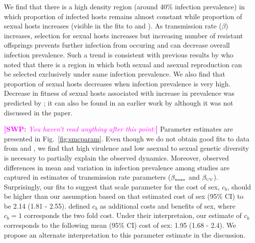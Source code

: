 \documentclass{article}\usepackage[]{graphicx}\usepackage[]{color}
\newcommand{\comment}[3]{\textcolor{#1}{\textbf{[#2: }\textit{#3}\textbf{]}}}
\newcommand{\swp}[1]{\comment{magenta}{SWP}{#1}}
\newcommand{\fref}[1]{Fig.~\ref{fig:#1}}
\begin{document}
We find that there is a high density region (around 40\% infection prevalence) in which proportion of infected hosts remains almost constant while proportion of sexual hosts increases (visible in the fits to \cite{mckone2016fine} and \cite{vergara2014infection}).
As transmission rate ($\beta$) increases, selection for sexual hosts increases but increasing number of resistant offsprings prevents further infection from occuring and can decrease overall infection prevalence.
Such a trend is consistent with previous results by \cite{lively2001trematode} who noted that there is a region in which both sexual and asexual reproduction can be selected exclusively under same infection prevalence.
We also find that proportion of sexual hosts decreases when infection prevalence is very high.
Decrease in fitness of sexual hosts associated with increase in prevalence was predicted by \cite{ashby2015diversity}; 
it can also be found in an earlier work by \cite{lively2010epidemiological} although it was not discussed in the paper.

\swp{You haven't read anything after this point:}
Parameter estimates are presented in \fref{smcparam}.
Even though we do not obtain good fits to data from \cite{dagan2013clonal} and \cite{mckone2016fine}, we find that high virulence and low asexual to sexual genetic diversity is necesary to partially explain the observed dynamics.
Moreover, observed differences in mean and variation in infection prevalence among studies are captured in estimates of transmission rate parameters ($\beta_{\textrm{\tiny mean}}$ and $\beta_{\textrm{\tiny CV}}$).
Surprisingly, our fits to \cite{mckone2016fine} suggest that scale parameter for the cost of sex, $c_b$, should be higher than our assumption based on \cite{gibson2017two} that estimated cost of sex (95\% CI) to be 2.14 (1.81 - 2.55).
\cite{ashby2015diversity} defined $c_b$ as additional costs and benefits of sex, where $c_b=1$ corresponds the two fold cost.
Under their interpretaion, our estimate of $c_b$ corresponds to the following mean (95\% CI) cost of sex: 1.95 (1.68 - 2.4).
We propose an alternate interpretation to this parameter estimate in the discussion.
\end{document}
